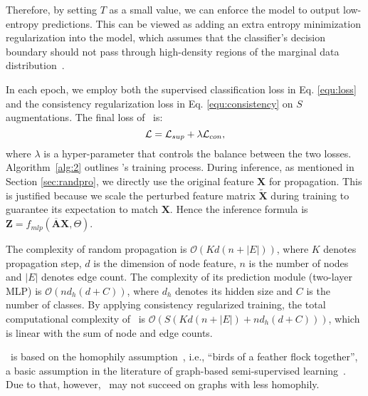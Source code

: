 Therefore, by setting $T$ as a small value, we can enforce the model to output low-entropy predictions. 
This can be viewed as adding an extra entropy minimization regularization into the model, which assumes that the classifier's decision boundary should not pass through high-density regions of the marginal data distribution~\cite{grandvalet2005semi}. 





In each epoch, we employ both the supervised classification loss in Eq. \ref{equ:loss} and the consistency regularization loss in Eq. \ref{equ:consistency} on $S$ augmentations. 
The final loss of \model\ is:
\begin{equation}
\small
\label{equ:inf}
	\mathcal{L} = \mathcal{L}_{sup} + \lambda \mathcal{L}_{con},
\end{equation}
where $\lambda$ is a hyper-parameter that controls the balance between the two losses. 
Algorithm~\ref{alg:2} outlines \model's training process. 
During inference, as mentioned in Section \ref{sec:randpro}, we directly use the original feature $\mathbf{X}$  for propagation. 
This is justified because we scale  the perturbed feature matrix $\widetilde{\mathbf{X}}$ during training to guarantee its expectation to match $\mathbf{X}$. Hence the inference formula is $\mathbf{Z} = f_{mlp}(\overline{\mathbf{A}}\mathbf{X}, \Theta)$.


 The complexity of random propagation is  $\mathcal{O}(Kd(n+|E|))$, where $K$ denotes propagation step, $d$ is the dimension of node feature, $n$ is the number of nodes and $|E|$ denotes edge count. The complexity of its prediction module (two-layer MLP) is $\mathcal{O}(nd_h(d+ C))$, where $d_h$ denotes its hidden size and $C$ is the number of classes. 
By applying consistency regularized training, the total computational complexity of \model\ is $\mathcal{O}(S(Kd(n + |E|)+ nd_h(d + C)))$, which is linear with the sum of node and edge counts. 

\model\ is based on the homophily assumption~\cite{mcpherson2001birds}, i.e., ``birds of a feather flock together'', a basic assumption in the literature of graph-based semi-supervised learning~\cite{zhu2003semi}. Due to that, however, \model\ may not succeed on graphs with less homophily. 



